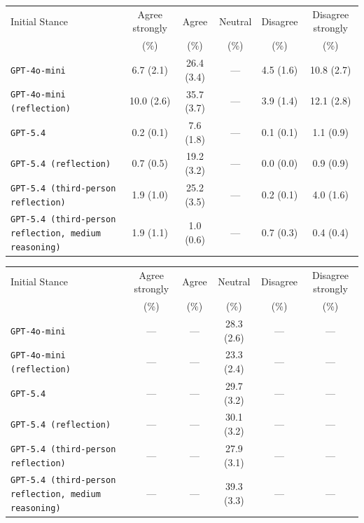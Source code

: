\begin{tabular}{lccccc}
		\\
		\hline
		Initial Stance & Agree strongly & Agree & Neutral & Disagree & Disagree strongly \\
		 & (\%) & (\%) & (\%) & (\%) & (\%) \\
		\hline
		\texttt{GPT-4o-mini} & 6.7 (2.1) & 26.4 (3.4) & --- & 4.5 (1.6) & 10.8 (2.7) \\
		\texttt{GPT-4o-mini (reflection)} & 10.0 (2.6) & 35.7 (3.7) & --- & 3.9 (1.4) & 12.1 (2.8) \\
		\texttt{GPT-5.4} & 0.2 (0.1) & 7.6 (1.8) & --- & 0.1 (0.1) & 1.1 (0.9) \\
		\texttt{GPT-5.4 (reflection)} & 0.7 (0.5) & 19.2 (3.2) & --- & 0.0 (0.0) & 0.9 (0.9) \\
		\texttt{GPT-5.4 (third-person reflection)} & 1.9 (1.0) & 25.2 (3.5) & --- & 0.2 (0.1) & 4.0 (1.6) \\
		\texttt{GPT-5.4 (third-person reflection, medium reasoning)} & 1.9 (1.1) & 1.0 (0.6) & --- & 0.7 (0.3) & 0.4 (0.4) \\
		\hline
\end{tabular}


\begin{tabular}{lccccc}
		\\
		\hline
		Initial Stance & Agree strongly & Agree & Neutral & Disagree & Disagree strongly \\
		 & (\%) & (\%) & (\%) & (\%) & (\%) \\
		\hline
		\texttt{GPT-4o-mini} & --- & --- & 28.3 (2.6) & --- & --- \\
		\texttt{GPT-4o-mini (reflection)} & --- & --- & 23.3 (2.4) & --- & --- \\
		\texttt{GPT-5.4} & --- & --- & 29.7 (3.2) & --- & --- \\
		\texttt{GPT-5.4 (reflection)} & --- & --- & 30.1 (3.2) & --- & --- \\
		\texttt{GPT-5.4 (third-person reflection)} & --- & --- & 27.9 (3.1) & --- & --- \\
		\texttt{GPT-5.4 (third-person reflection, medium reasoning)} & --- & --- & 39.3 (3.3) & --- & --- \\
		\hline
\end{tabular}

